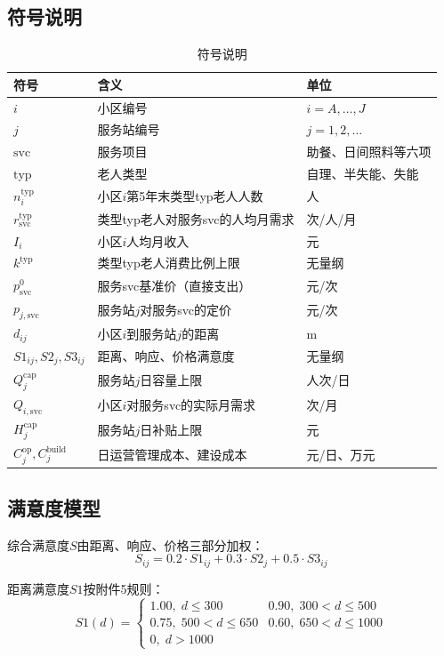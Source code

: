 \documentclass[12pt,a4paper]{article}
\begin{document}
\subsection{符号说明}
\begin{table}[htbp]
\centering
\caption{符号说明}
\begin{tabular}{@{}lll@{}}
\toprule
符号 & 含义 & 单位 \\
\midrule
$i$ & 小区编号 & $i=A,\ldots,J$ \\
$j$ & 服务站编号 & $j=1,2,\ldots$ \\
$\text{svc}$ & 服务项目 & 助餐、日间照料等六项 \\
$\text{typ}$ & 老人类型 & 自理、半失能、失能 \\
$n_i^{\text{typ}}$ & 小区$i$第5年末类型typ老人人数 & 人 \\
$r_{\text{svc}}^{\text{typ}}$ & 类型typ老人对服务svc的人均月需求 & 次/人/月 \\
$I_i$ & 小区$i$人均月收入 & 元 \\
$k^{\text{typ}}$ & 类型typ老人消费比例上限 & 无量纲 \\
$p_{\text{svc}}^0$ & 服务svc基准价（直接支出） & 元/次 \\
$p_{j,\text{svc}}$ & 服务站$j$对服务svc的定价 & 元/次 \\
$d_{ij}$ & 小区$i$到服务站$j$的距离 & m \\
$S1_{ij},S2_j,S3_{ij}$ & 距离、响应、价格满意度 & 无量纲 \\
$Q_j^{\text{cap}}$ & 服务站$j$日容量上限 & 人次/日 \\
$Q_{i,\text{svc}}$ & 小区$i$对服务svc的实际月需求 & 次/月 \\
$H_j^{\text{cap}}$ & 服务站$j$日补贴上限 & 元 \\
$C_j^{\text{op}}, C_j^{\text{build}}$ & 日运营管理成本、建设成本 & 元/日、万元 \\
\bottomrule
\end{tabular}
\end{table}

\subsection{满意度模型}
综合满意度$S$由距离、响应、价格三部分加权：
\begin{equation}
S_{ij} = 0.2\cdot S1_{ij} + 0.3\cdot S2_j + 0.5\cdot S3_{ij}
\label{eq:S}
\end{equation}

距离满意度$S1$按附件5规则：
\begin{equation}
S1(d)=
\begin{cases}
1.00,\;d\leq300 & 0.90,\;300<d\leq500 \\
0.75,\;500<d\leq650 & 0.60,\;650<d\leq1000 \\
0,\;d>1000 &
\end{cases}
\label{eq:S1}
\end{equation}
\end{document}
